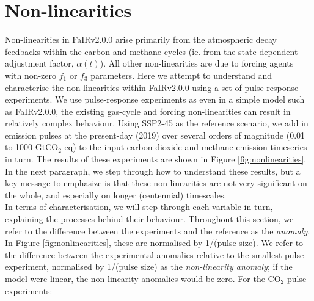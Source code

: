 \documentclass[gmd, manuscript]{copernicus}
\begin{document}
\section{Non-linearities}
Non-linearities in FaIRv2.0.0 arise primarily from the atmospheric decay feedbacks within the carbon and methane cycles (ie. from the state-dependent adjustment factor, $\alpha(t)$). All other non-linearities are due to forcing agents with non-zero $f_1$ or $f_3$ parameters. Here we attempt to understand and characterise the non-linearities within FaIRv2.0.0 using a set of pulse-response experiments. We use pulse-response experiments as even in a simple model such as FaIRv2.0.0, the existing gas-cycle and forcing non-linearities can result in relatively complex behaviour. Using SSP2-45 as the reference scenario, we add in emission pulses at the present-day (2019) over several orders of magnitude (0.01 to 1000 GtCO$_2$-eq) to the input carbon dioxide and methane emission timeseries in turn. The results of these experiments are shown in Figure \ref{fig:nonlinearities}. In the next paragraph, we step through how to understand these results, but a key message to emphasize is that these non-linearities are not very significant on the whole, and especially on longer (centennial) timescales.\\
In terms of characterisation, we will step through each variable in turn, explaining the processes behind their behaviour. Throughout this section, we refer to the difference between the experiments and the reference as the \emph{anomaly}. In Figure \ref{fig:nonlinearities}, these are normalised by 1/(pulse size). We refer to the difference between the experimental anomalies relative to the smallest pulse experiment, normalised by 1/(pulse size) as the \emph{non-linearity anomaly}; if the model were linear, the non-linearity anomalies would be zero. For the CO$_2$ pulse experiments:
\end{document}
